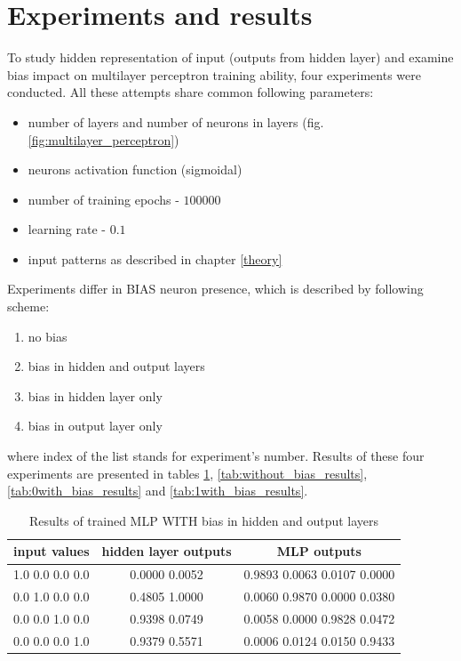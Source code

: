 \documentclass{classrep}
\begin{document}
    \section{Experiments and results} \label{results} {
        To study hidden representation of input (outputs from hidden layer) and examine bias impact on
        multilayer perceptron training ability, four experiments were conducted. All
        these attempts share common following parameters:
        \begin{itemize}
            \item number of layers and number of neurons in layers (fig. \ref{fig:multilayer_perceptron})
            \item neurons activation function (sigmoidal)
            \item number of training epochs - $100 000$
            \item learning rate - $0.1$
            \item input patterns as described in chapter \ref{theory}
        \end{itemize}
        Experiments differ in BIAS neuron presence, which is described by following scheme:
        \begin{enumerate}
            \item no bias
            \item bias in hidden and output layers
            \item bias in hidden layer only
            \item bias in output layer only
        \end{enumerate}
        where index of the list stands for experiment's number.  Results of these four experiments
        are presented in tables \ref{tab:with_bias_results}, \ref{tab:without_bias_results},
        \ref{tab:0with_bias_results} and \ref{tab:1with_bias_results}.

        \begin{table}[!htbp]
            \centering
            \begin{tabular}{|c|c|c|}
                \hline
                input values & hidden layer outputs & MLP outputs \\ \hline
                1.0 0.0 0.0 0.0 & 0.0000 0.0052 & 0.9893 0.0063 0.0107 0.0000 \\
                0.0 1.0 0.0 0.0 & 0.4805 1.0000 & 0.0060 0.9870 0.0000 0.0380 \\
                0.0 0.0 1.0 0.0 & 0.9398 0.0749 & 0.0058 0.0000 0.9828 0.0472 \\
                0.0 0.0 0.0 1.0 & 0.9379 0.5571 & 0.0006 0.0124 0.0150 0.9433 \\ \hline
            \end{tabular}
            \caption{Results of trained MLP WITH bias in hidden and output layers}
            \label{tab:with_bias_results}
        \end{table}
        \FloatBarrier

}
\end{document}
